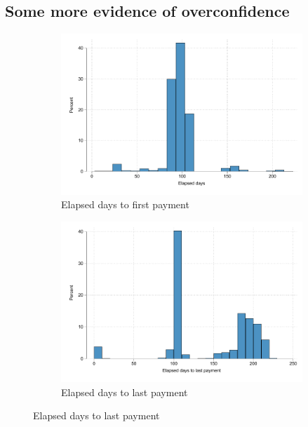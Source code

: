 \newpage
\subsection{Some more evidence of overconfidence}

\vspace{.2in}
\begin{figure}[H]
    \caption{Behavior of borrowers who lost their pawn}
    \label{proxy_naive}
    \begin{center}
    \begin{subfigure}{0.40\textwidth}
        \caption{Elapsed days to first payment}
        \centering
        \includegraphics[width=\textwidth]{Figuras/hist_firstdays_default.pdf}
    \end{subfigure}
    \begin{subfigure}{0.40\textwidth}
        \caption{Elapsed days to last payment}
        \centering
        \includegraphics[width=\textwidth]{Figuras/hist_days_default.pdf}

\end{subfigure}
\end{center}
\end{figure}
